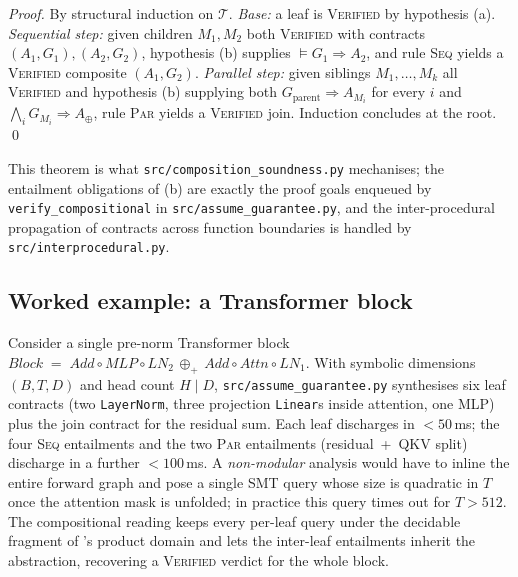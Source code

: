 \begin{proof}
By structural induction on $\mathcal{T}$.
\emph{Base:} a leaf is \textsc{Verified} by hypothesis (a).
\emph{Sequential step:} given children $M_1,M_2$ both
\textsc{Verified} with contracts $(A_1,G_1),(A_2,G_2)$, hypothesis
(b) supplies $\models G_1\!\Rightarrow\!A_2$, and rule \textsc{Seq}
yields a \textsc{Verified} composite $(A_1,G_2)$.
\emph{Parallel step:} given siblings $M_1,\dots,M_k$ all
\textsc{Verified} and hypothesis (b) supplying both
$G_{\text{parent}}\!\Rightarrow\!A_{M_i}$ for every $i$ and
$\bigwedge_i G_{M_i}\!\Rightarrow\!A_\oplus$, rule \textsc{Par} yields
a \textsc{Verified} join.  Induction concludes at the root.
\qed
\end{proof}

This theorem is what \texttt{src/composition\_soundness.py} mechanises;
the entailment obligations of (b) are exactly the proof goals enqueued
by \texttt{verify\_compositional} in
\texttt{src/assume\_guarantee.py}, and the inter-procedural propagation
of contracts across function boundaries is handled by
\texttt{src/interprocedural.py}.

\subsection{Worked example: a Transformer block}
\label{sec:ag:example}

Consider a single pre-norm Transformer block
$\mathit{Block} \;=\; \mathit{Add}\circ \mathit{MLP}\circ\mathit{LN}_2
\,\oplus_{+}\, \mathit{Add}\circ\mathit{Attn}\circ\mathit{LN}_1$.
With symbolic dimensions $(B,T,D)$ and head count $H\!\mid\!D$,
\texttt{src/assume\_guarantee.py} synthesises six leaf contracts (two
\texttt{LayerNorm}, three projection \texttt{Linear}s inside attention,
one MLP) plus the join contract for the residual sum.  Each leaf
discharges in $<\!50$\,ms; the four \textsc{Seq} entailments and the
two \textsc{Par} entailments (residual~+~QKV split) discharge in a
further $<\!100$\,ms.  A \emph{non-modular} analysis would have to
inline the entire forward graph and pose a single SMT query whose size
is quadratic in $T$ once the attention mask is unfolded; in practice
this query times out for $T\!>\!512$.  The compositional reading
keeps every per-leaf query under the decidable
fragment of \citet{cousot1977abstract}'s product domain and lets the
inter-leaf entailments inherit the abstraction, recovering a
\textsc{Verified} verdict for the whole block.
